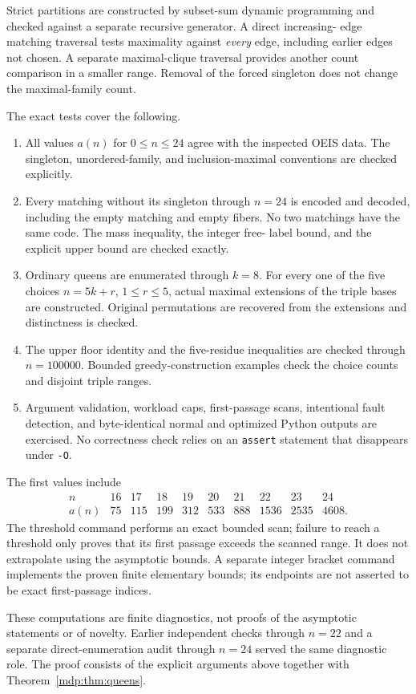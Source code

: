 \documentclass[11pt,letterpaper]{article}
\numberwithin{equation}{section}
\theoremstyle{remark}\newtheorem{remark}[theorem]{Remark}
\begin{document}
Strict partitions are constructed by subset-sum dynamic programming
and checked against a separate recursive generator. A direct increasing-
edge matching traversal tests maximality against \emph{every} edge,
including earlier edges not chosen. A separate maximal-clique traversal
provides another count comparison in a smaller range. Removal of the
forced singleton does not change the maximal-family count.

The exact tests cover the following.
\begin{enumerate}
\item All values $a(n)$ for $0\le n\le24$ agree with the inspected
OEIS data. The singleton, unordered-family, and inclusion-maximal
conventions are checked explicitly.
\item Every matching without its singleton through $n=24$ is encoded
and decoded, including the empty matching and empty fibers. No two
matchings have the same code. The mass inequality, the integer free-
label bound, and the explicit upper bound are checked exactly.
\item Ordinary queens are enumerated through $k=8$. For every one of
the five choices $n=5k+r$, $1\le r\le5$, actual maximal extensions
of the triple bases are constructed. Original permutations are
recovered from the extensions and distinctness is checked.
\item The upper floor identity and the five-residue inequalities are
checked through $n=100000$. Bounded greedy-construction examples
check the choice counts and disjoint triple ranges.
\item Argument validation, workload caps, first-passage scans,
intentional fault detection, and byte-identical normal and optimized
Python outputs are exercised. No correctness check relies on an
\texttt{assert} statement that disappears under \texttt{-O}.
\end{enumerate}
The first values include
\[
\begin{array}{c|rrrrrrrrr}
n&16&17&18&19&20&21&22&23&24\\\hline
a(n)&75&115&199&312&533&888&1536&2535&4608.
\end{array}
\]
The threshold command performs an exact bounded scan; failure to reach
a threshold only proves that its first passage exceeds the scanned
range. It does not extrapolate using the asymptotic bounds. A separate integer
bracket command implements the proven finite elementary bounds; its
endpoints are not asserted to be exact first-passage indices.

These computations are finite diagnostics, not proofs of the
asymptotic statements or of novelty. Earlier independent checks
through $n=22$ and a separate direct-enumeration audit through $n=24$
served the same diagnostic role. The proof consists of the explicit
arguments above together with Theorem~\ref{mdp:thm:queens}.
\end{document}
